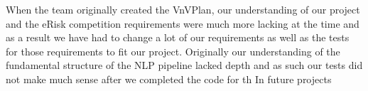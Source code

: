 \documentclass[12pt, titlepage]{article}
\begin{document}
When the team originally created the VnVPlan, our understanding of our project and the eRisk competition requirements were much more lacking at the time and as a result we have had to change a lot of our requirements as well as the tests for those requirements to fit our project. Originally our understanding of the fundamental structure of the NLP pipeline lacked depth and as such our tests did not make much sense after we completed the code for th In future projects 
\end{document}
